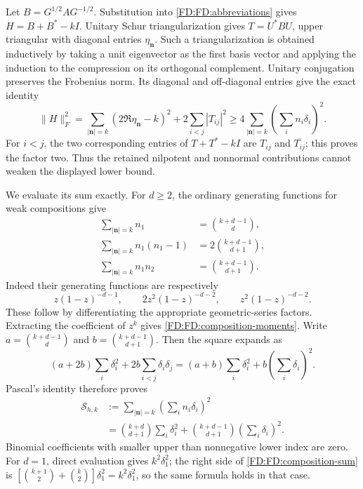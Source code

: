 Let \(B=G^{1/2}AG^{-1/2}\).  Substitution into
\eqref{FD:FD:abbreviations} gives \(H=B+B^*-kI\).
Unitary Schur triangularization gives \(T=U^*BU\), upper triangular
with diagonal entries \(\eta_{\mathbf n}\).  Such a triangularization
is obtained inductively by taking a unit eigenvector as the first basis
vector and applying the induction to the compression on its orthogonal
complement.  Unitary conjugation preserves the Frobenius norm.  Its
diagonal and off-diagonal entries give the exact identity
\begin{equation}
\|H\|_F^2
=\sum_{|\mathbf n|=k}(2\Re\eta_{\mathbf n}-k)^2
+2\sum_{i<j}|T_{ij}|^2
\ge4\sum_{|\mathbf n|=k}\left(\sum_i n_i\delta_i\right)^2.
\tag{FD.31}\label{FD:FD:Schur-exact}
\end{equation}
For \(i<j\), the two corresponding entries of \(T+T^*-kI\) are
\(T_{ij}\) and \(\overline{T_{ij}}\); this proves the factor two.
Thus the retained nilpotent and nonnormal contributions cannot weaken
the displayed lower bound.

We evaluate its sum exactly.  For \(d\ge2\), the ordinary generating
functions for weak compositions give
\begin{equation}
\begin{aligned}
\sum_{|\mathbf n|=k}n_1&=\binom{k+d-1}{d},\\
\sum_{|\mathbf n|=k}n_1(n_1-1)&=2\binom{k+d-1}{d+1},\\
\sum_{|\mathbf n|=k}n_1n_2&=\binom{k+d-1}{d+1}.
\end{aligned}
\tag{FD.32}\label{FD:FD:composition-moments}
\end{equation}
Indeed their generating functions are respectively
\[
z(1-z)^{-d-1},\qquad
2z^2(1-z)^{-d-2},\qquad
z^2(1-z)^{-d-2}.
\]
These follow by differentiating the appropriate geometric-series
factors.  Extracting the coefficient of \(z^k\)
gives \eqref{FD:FD:composition-moments}.  Write
\(a=\binom{k+d-1}{d}\) and \(b=\binom{k+d-1}{d+1}\).
Then the square expands as
\[
(a+2b)\sum_i\delta_i^2+2b\sum_{i<j}\delta_i\delta_j
=(a+b)\sum_i\delta_i^2+b\left(\sum_i\delta_i\right)^2.
\]
Pascal's identity therefore proves
\begin{equation}
\begin{aligned}
\mathcal S_{h,k}
&:=\sum_{|\mathbf n|=k}\left(\sum_i n_i\delta_i\right)^2\\
&=\binom{k+d}{d+1}\sum_i\delta_i^2
+\binom{k+d-1}{d+1}\left(\sum_i\delta_i\right)^2.
\end{aligned}
\tag{FD.33}\label{FD:FD:composition-sum}
\end{equation}
Binomial coefficients with smaller upper than nonnegative lower index
are zero.  For \(d=1\), direct evaluation gives \(k^2\delta_1^2\);
the right side of \eqref{FD:FD:composition-sum} is
\([\binom{k+1}{2}+\binom{k}{2}]\delta_1^2=k^2\delta_1^2\), so the
same formula holds in that case.

